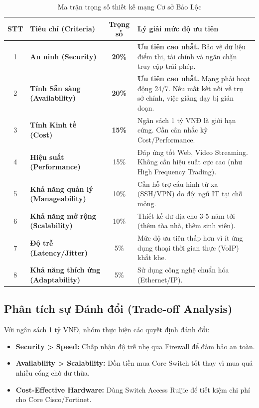 \begin{table}[H]
\centering
\renewcommand{\arraystretch}{1.3}
\begin{tabularx}{\linewidth}{|c|l|c|X|}
\hline
\rowcolor[HTML]{EFEFEF} 
\textbf{STT} & \textbf{Tiêu chí (Criteria)} & \textbf{Trọng số} & \textbf{Lý giải mức độ ưu tiên} \\ \hline
1 & \textbf{An ninh (Security)} & \textbf{20\%} & \textbf{Ưu tiên cao nhất.} Bảo vệ dữ liệu điểm thi, tài chính và ngăn chặn truy cập trái phép. \\ \hline
2 & \textbf{Tính Sẵn sàng (Availability)} & \textbf{20\%} & \textbf{Ưu tiên cao nhất.} Mạng phải hoạt động 24/7. Nếu mất kết nối về trụ sở chính, việc giảng dạy bị gián đoạn. \\ \hline
3 & \textbf{Tính Kinh tế (Cost)} & \textbf{15\%} & Ngân sách 1 tỷ VNĐ là giới hạn cứng. Cần cân nhắc kỹ Cost/Performance. \\ \hline
4 & \textbf{Hiệu suất (Performance)} & 15\% & Đáp ứng tốt Web, Video Streaming. Không cần hiệu suất cực cao (như High Frequency Trading). \\ \hline
5 & \textbf{Khả năng quản lý (Manageability)} & 10\% & Cần hỗ trợ cấu hình từ xa (SSH/VPN) do đội ngũ IT tại chỗ mỏng. \\ \hline
6 & \textbf{Khả năng mở rộng (Scalability)} & 10\% & Thiết kế dư địa cho 3-5 năm tới (thêm tòa nhà, thêm sinh viên). \\ \hline
7 & \textbf{Độ trễ (Latency/Jitter)} & 5\% & Mức độ ưu tiên thấp hơn vì ít ứng dụng thoại thời gian thực (VoIP) khắt khe. \\ \hline
8 & \textbf{Khả năng thích ứng (Adaptability)} & 5\% & Sử dụng công nghệ chuẩn hóa (Ethernet/IP). \\ \hline
\end{tabularx}
\caption{Ma trận trọng số thiết kế mạng Cơ sở Bảo Lộc}
\label{tab:matrix}
\end{table}

\subsection{Phân tích sự Đánh đổi (Trade-off Analysis)}
Với ngân sách 1 tỷ VNĐ, nhóm thực hiện các quyết định đánh đổi:
\begin{itemize}
    \item \textbf{Security > Speed:} Chấp nhận độ trễ nhẹ qua Firewall để đảm bảo an toàn.
    \item \textbf{Availability > Scalability:} Dồn tiền mua Core Switch tốt thay vì mua quá nhiều cổng chờ dư thừa.
    \item \textbf{Cost-Effective Hardware:} Dùng Switch Access Ruijie để tiết kiệm chi phí cho Core Cisco/Fortinet.
\end{itemize}